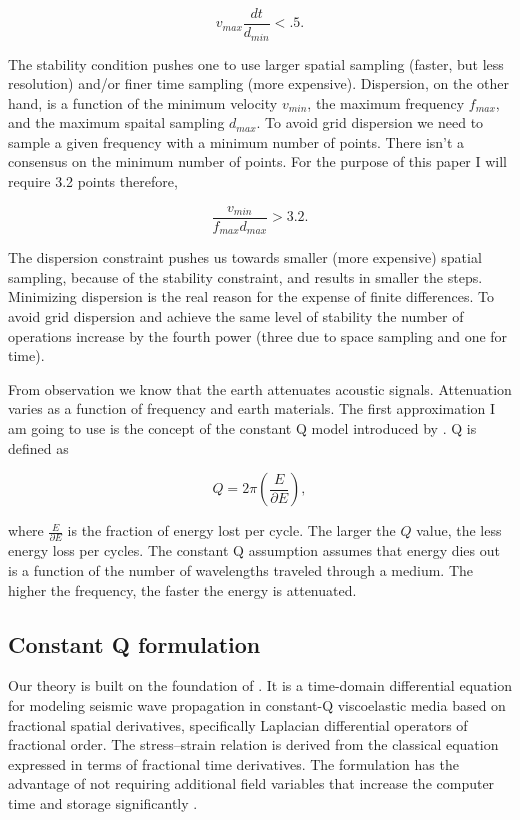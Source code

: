 \documentclass{paris17}
\begin{document}
\begin{equation}
v_{max}\frac{dt}{d_{min}} < .5 \label{eq:stability}.
\end{equation}

The stability condition pushes one to use larger spatial sampling (faster, but less resolution) and/or finer time sampling (more expensive).  Dispersion, on the other hand, is a function of the minimum velocity $v_{min}$, the maximum frequency $f_{max}$, and the maximum spaital sampling $d_{max}$.   To avoid grid dispersion we need to  sample a given frequency with a minimum number of points.  There isn't a consensus on the minimum number
of points. For the purpose of this paper I will require  3.2  points therefore,

\begin{equation}
\frac{v_{min} }{f_{max}d_{max}} > 3.2 \label{eq:dispersion}.
\end{equation}

The dispersion constraint pushes us towards smaller (more expensive) spatial sampling, because of the stability constraint, and results in smaller the steps.  Minimizing dispersion is the real reason for the expense of finite differences.  To avoid grid dispersion and achieve the same level of stability the number of operations increase by the fourth power (three due to space sampling and one for time).

From observation we know that the earth attenuates acoustic signals.  Attenuation varies as a function of frequency and earth materials. The first approximation I am going to use is the concept of the constant Q model introduced by \cite{Kjartansson.sep.23}.  Q is defined as

\begin{equation}
Q=2 \pi \left( \frac{E}{\partial E}\right),
\end{equation}

where $\frac{E}{\partial E}$ is the fraction of energy lost per cycle. The larger the $Q$ value, the less energy loss per cycles.  The constant Q assumption assumes that energy dies out is a function of the number of wavelengths traveled through a medium. The higher the frequency, the faster the energy is attenuated.

\subsection{Constant Q formulation}

Our theory is built on the foundation of \cite[]{zhu2014theory}. It is a time-domain differential equation for modeling seismic wave propagation in constant-Q viscoelastic media based on fractional spatial derivatives, specifically Laplacian differential operators of fractional order.  The stress–strain relation is derived from the classical equation expressed in terms of fractional time derivatives. The formulation has the advantage of not requiring additional field variables that increase the computer time and storage significantly \cite[]{zhu2014theory}.
\end{document}
